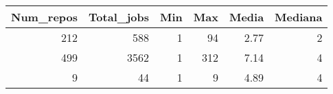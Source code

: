 \begin{tabular}{rrrrrr}
\toprule
 Num\_repos &  Total\_jobs &  Min &  Max &  Media &  Mediana \\
\midrule
       212 &         588 &    1 &   94 &   2.77 &        2 \\
       499 &        3562 &    1 &  312 &   7.14 &        4 \\
         9 &          44 &    1 &    9 &   4.89 &        4 \\
\bottomrule
\end{tabular}

